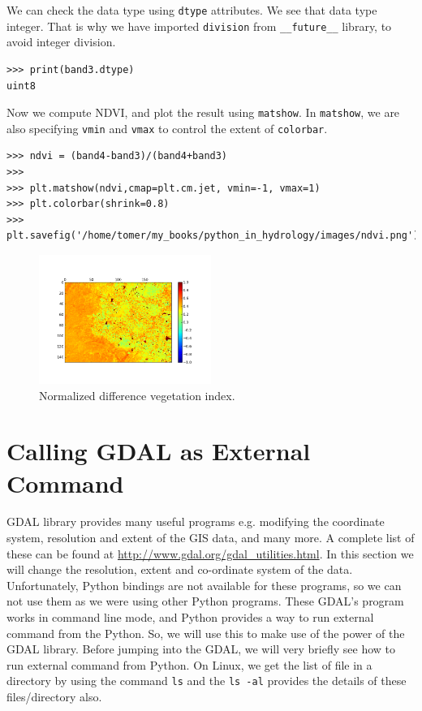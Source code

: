 \documentclass[10pt]{book}
\begin{document}
{We can check the data type using \verb"dtype" attributes. We see that data type integer. That is why we have imported \verb"division" from \verb"__future__" library, to avoid integer division. 
\beforeverb \begin{verbatim}
>>> print(band3.dtype)
uint8
\end{verbatim} \afterverb 

Now we compute NDVI, and plot the result using \verb"matshow". In \verb"matshow", we are also specifying \verb"vmin" and \verb"vmax" to control the extent of \verb"colorbar". 
\beforeverb \begin{verbatim}
>>> ndvi = (band4-band3)/(band4+band3)
>>> 
>>> plt.matshow(ndvi,cmap=plt.cm.jet, vmin=-1, vmax=1)
>>> plt.colorbar(shrink=0.8)
>>> plt.savefig('/home/tomer/my_books/python_in_hydrology/images/ndvi.png')
\end{verbatim} \afterverb

\beforefig
\begin{figure}[h!]
  \centering
    \includegraphics[width=0.5\textwidth]{images/ndvi.png}
  \caption{Normalized difference vegetation index.}
   \label{fig:ndvi}
\end{figure}
\afterfig


\section{Calling GDAL as External Command}}
GDAL library provides many useful programs e.g. modifying the coordinate system, resolution and extent of the GIS data, and many more. A complete list of these can be found at \url{http://www.gdal.org/gdal_utilities.html}. In this section we will change the resolution, extent and co-ordinate system of the data. Unfortunately, Python bindings are not available for these programs, so we can not use them as we were using other Python programs. These GDAL's program works in command line mode, and Python provides a way to run external command from the Python. So, we will use this to make use of the power of the GDAL library. Before jumping into the GDAL, we will very briefly see how to run external command from Python. On Linux, we get the list of file in a directory by using the command \verb"ls" and the \verb"ls -al" provides the details of these files/directory also.
\end{document}
